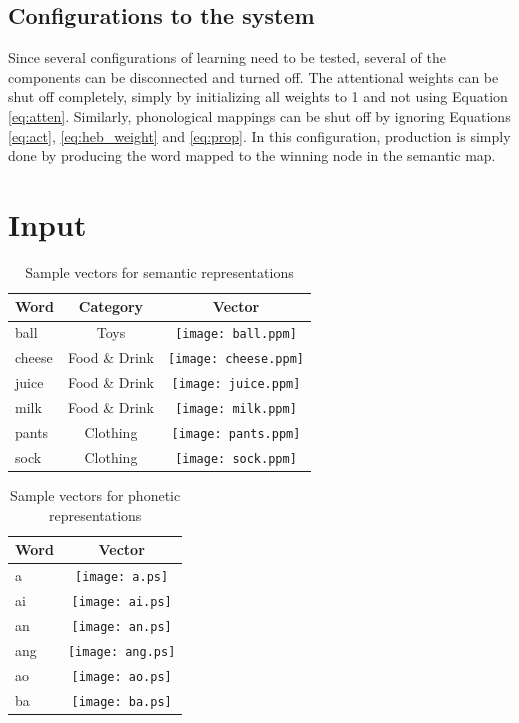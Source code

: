 \documentclass[a4paper,11pt]{article}
\begin{document}
\subsection{Configurations to the system}

Since several configurations of learning need to be tested, several of the
components can be disconnected and turned off.  The attentional weights can be
shut off completely, simply by initializing all weights to 1 and not using
Equation \ref{eq:atten}.  Similarly, phonological mappings can be shut off by
ignoring Equations \ref{eq:act}, \ref{eq:heb_weight} and \ref{eq:prop}.  In
this configuration, production is simply done by producing the word mapped to
the winning node in the semantic map.

\section{Input}

\begin{center}
  \begin{table}
    \begin{tabular}[t] { | l | c | c | }
      \hline
      Word & Category & Vector \\
      \hline
      ball & Toys & \texttt{[image: ball.ppm]} \\
      cheese & Food \& Drink & \texttt{[image: cheese.ppm]} \\
      juice & Food \& Drink &\texttt{[image: juice.ppm]} \\ 
      milk & Food \& Drink &\texttt{[image: milk.ppm]} \\ 
      pants & Clothing & \texttt{[image: pants.ppm]} \\
      sock & Clothing &\texttt{[image: sock.ppm]} \\
      \hline
    \end{tabular}
    \caption{Sample vectors for semantic representations}
    \label{tb:semantics}
  \end{table}
\end{center}

\begin{center}
  \begin{table}
    \begin{tabular}[t] { | l | c | }
      \hline
      Word & Vector \\
      \hline
      a &  \texttt{[image: a.ps]} \\
      ai &  \texttt{[image: ai.ps]} \\
      an & \texttt{[image: an.ps]} \\ 
      ang & \texttt{[image: ang.ps]} \\ 
      ao & \texttt{[image: ao.ps]} \\
      ba & \texttt{[image: ba.ps]} \\
      \hline
    \end{tabular}
    \caption{Sample vectors for phonetic representations}
    \label{tb:phono}
  \end{table}
\end{center}
\end{document}
